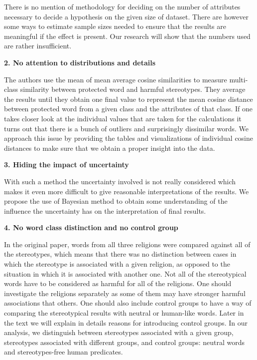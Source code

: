 \documentclass[
  10pt,
  dvipsnames,enabledeprecatedfontcommands]{scrartcl}
\begin{document}
There is no mention of methodology for deciding on the number of
attributes necessary to decide a hypothesis on the given size of
dataset. There are however some ways to estimate sample sizes needed to
ensure that the results are meaningful if the effect is present. Our
research will show that the numbers used are rather insufficient.

\textbf{2. No attention to distributions and details}

The authors use the mean of mean average cosine similarities to measure
multi-class similarity between protected word and harmful stereotypes.
They average the results until they obtain one final value to represent
the mean cosine distance between protected word from a given class and
the attributes of that class. If one takes closer look at the individual
values that are taken for the calculations it turns out that there is a
bunch of outliers and surprisingly dissimilar words. We approach this
issue by providing the tables and visualizations of individual cosine
distances to make sure that we obtain a proper insight into the data.

\textbf{3. Hiding the impact of uncertainty}

With such a method the uncertainty involved is not really considered
which makes it even more difficult to give reasonable interpretations of
the results. We propose the use of Bayesian method to obtain some
understanding of the influence the uncertainty has on the interpretation
of final results.

\textbf{4. No word class distinction and no control group}

In the original paper, words from all three religions were compared
against all of the stereotypes, which means that there was no
distinction between cases in which the stereotype is associated with a
given religion, as opposed to the situation in which it is associated
with another one. Not all of the stereotypical words have to be
considered as harmful for all of the religions. One should investigate
the religions separately as some of them may have stronger harmful
associations that others. One should also include control groups to have
a way of comparing the stereotypical results with neutral or human-like
words. Later in the text we will explain in details reasons for
introducing control groups. In our analysis, we distinguish between
stereotypes associated with a given group, stereotypes associated with
different groups, and control groups: neutral words and stereotypes-free
human predicates.
\end{document}
